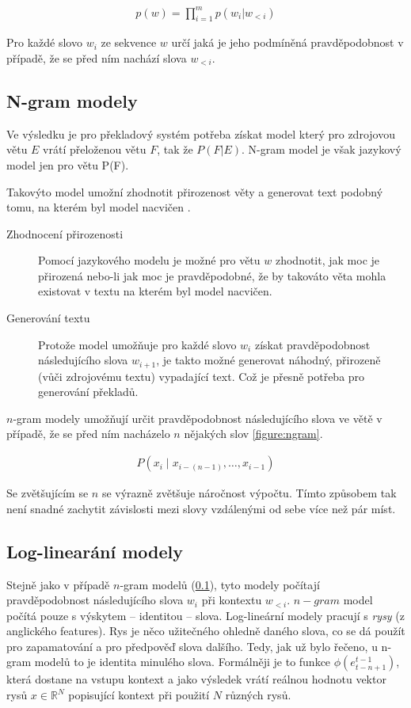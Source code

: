 \begin{align}\label{figure:probdistr}
  p(w) = \prod_{i=1}^{m} p(w_i|w_{<i})
\end{align}

Pro každé slovo $w_i$ ze sekvence $w$ určí jaká je jeho podmíněná pravděpodobnost v případě, že se před ním nachází slova $w_{<i}$.

\subsection{N-gram modely}\label{subsection:ngram}
Ve výsledku je pro překladový systém potřeba získat model který pro zdrojovou větu $E$ vrátí přeloženou větu $F$, tak že $P(F|E)$. N-gram model je však jazykový model jen pro větu P(F).

Takovýto model umožní zhodnotit přirozenost věty a generovat text podobný tomu, na kterém byl model nacvičen \cite{nmtTutorial}.

\begin{description}
  \item[Zhodnocení přirozenosti] Pomocí jazykového modelu je možné pro větu $w$ zhodnotit, jak moc je přirozená nebo-li jak moc je pravděpodobné, že by takováto věta mohla existovat v textu na kterém byl model nacvičen.
  \item[Generování textu] Protože model umožňuje pro každé slovo $w_i$ získat pravděpodobnost následujícího slova $w_{i+1}$, je takto možné generovat náhodný, přirozeně (vůči zdrojovému textu) vypadající text. Což je přesně potřeba pro generování překladů.
\end{description}

$n$-gram modely umožňují určit pravděpodobnost následujícího slova ve větě v případě, že se před ním nacházelo $n$ nějakých slov \ref{figure:ngram}.

\begin{align}\label{figure:ngram}
    P(x_{i}\mid x_{{i-(n-1)}},\dots ,x_{{i-1}})
\end{align}

Se zvětšujícím se $n$ se výrazně zvětšuje náročnost výpočtu. Tímto způsobem tak není snadné zachytit závislosti mezi slovy vzdálenými od sebe více než pár míst.

\subsection{Log-linearání modely}
Stejně jako v případě $n$-gram modelů (\ref{subsection:ngram}), tyto modely počítají pravděpodobnost následujícího slova $w_i$ při kontextu $w_{<i}$. $n-gram$ model počítá pouze s výskytem -- identitou -- slova. Log-lineární modely pracují s \emph{rysy} (z anglického features). Rys je něco užitečného ohledně daného slova, co se dá použít pro zapamatování a pro předpověď slova dalšího. Tedy, jak už bylo řečeno, u n-gram modelů to je identita minulého slova. Formálněji je to funkce $\phi(e^{t-1}_{t-n+1})$, která dostane na vstupu kontext a jako výsledek vrátí reálnou hodnotu vektor rysů $x \in \mathbb{R}^N$ popisující kontext při použití $N$ různých rysů.

